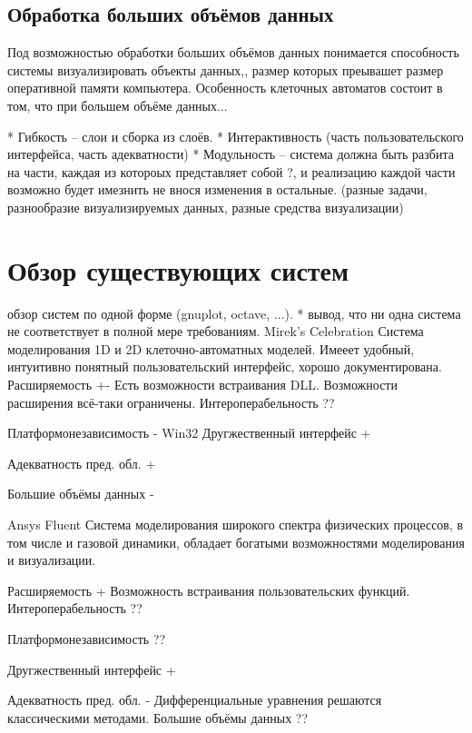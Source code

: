 \documentclass[a4paper,12pt]{extarticle}
\let\stdsection\section
\renewcommand\section{\newpage\stdsection}
\begin{document}
\subsection{Обработка больших объёмов данных}
Под возможностью обработки больших объёмов данных понимается способность системы визуализировать объекты данных,, размер которых преывашет размер оперативной памяти компьютера. Особенность клеточных автоматов состоит в том, что при большем объёме данных... 

* Гибкость -- слои и сборка из слоёв.
* Интерактивность (часть пользовательского интерфейса, часть адекватности)
* Модульность -- система должна быть разбита на части, каждая из котороых представляет собой ?, и реализацию каждой части возможно будет имезнить не внося изменения в остальные. (разные задачи, разнообразие визуализируемых данных, разные средства визуализации)



\section{Обзор существующих систем}

обзор систем по одной форме (gnuplot, octave, ...).
* вывод, что ни одна система не соответствует в полной мере требованиям.
Mirek's Celebration
Система моделирования 1D и 2D клеточно-автоматных моделей.
Имееет удобный, интуитивно понятный пользовательский интерфейс, хорошо документирована.
Расширяемость
+-
Есть возможности встраивания DLL. Возможности расширения всё-таки ограничены.
Интероперабельность
??

Платформонезависимость
-
Win32
Другжественный интерфейс
+

Адекватность пред. обл.
+

Большие объёмы данных
-


Ansys Fluent
Система моделирования широкого спектра физических процессов, в том числе и газовой динамики, обладает богатыми возможностями моделирования и визуализации.

Расширяемость
+
Возможность встраивания пользовательских функций.
Интероперабельность
??

Платформонезависимость
??

Другжественный интерфейс
+

Адекватность пред. обл.
-
Дифференциальные уравнения решаются классическими методами.
Большие объёмы данных
??
\end{document}
